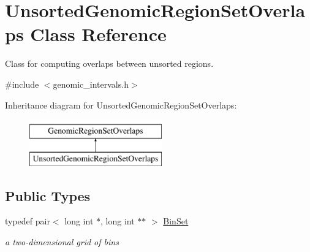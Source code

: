 \hypertarget{classUnsortedGenomicRegionSetOverlaps}{
\section{UnsortedGenomicRegionSetOverlaps Class Reference}
\label{classUnsortedGenomicRegionSetOverlaps}
}


Class for computing overlaps between unsorted regions.  




{\ttfamily \#include $<$genomic\_\-intervals.h$>$}

Inheritance diagram for UnsortedGenomicRegionSetOverlaps:\begin{figure}[H]
\begin{center}
\leavevmode
\includegraphics[height=2.000000cm]{classUnsortedGenomicRegionSetOverlaps}
\end{center}
\end{figure}
\subsection*{Public Types}
\begin{DoxyCompactItemize}
\item 
\hypertarget{classUnsortedGenomicRegionSetOverlaps_a0f0857dd93ad3c047d1f5056a57edc14}{
typedef pair$<$ long int $\ast$, long int $\ast$$\ast$ $>$ \hyperlink{classUnsortedGenomicRegionSetOverlaps_a0f0857dd93ad3c047d1f5056a57edc14}{BinSet}}
\label{classUnsortedGenomicRegionSetOverlaps_a0f0857dd93ad3c047d1f5056a57edc14}

\begin{DoxyCompactList}\small\item\em a two-\/dimensional grid of bins \end{DoxyCompactList}\end{DoxyCompactItemize}
